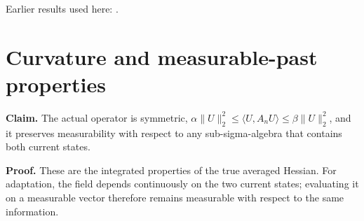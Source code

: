 \documentclass[11pt,a4paper]{article}
\begin{document}
Earlier results used here: \cite[Section~3.13.2]{LangevinLean2026ULASC}.

\section{\texorpdfstring{Curvature and measurable-past properties}{Curvature and measurable-past properties}}


\textbf{Claim.} The actual operator is symmetric, \(\alpha\|U\|_2^2\le\langle U,A_nU\rangle\le\beta\|U\|_2^2\), and it preserves measurability with respect to any sub-sigma-algebra that contains both current states.



\textbf{Proof.} These are the integrated properties of the true averaged Hessian. For adaptation, the field depends continuously on the two current states; evaluating it on a measurable vector therefore remains measurable with respect to the same information.
\end{document}
